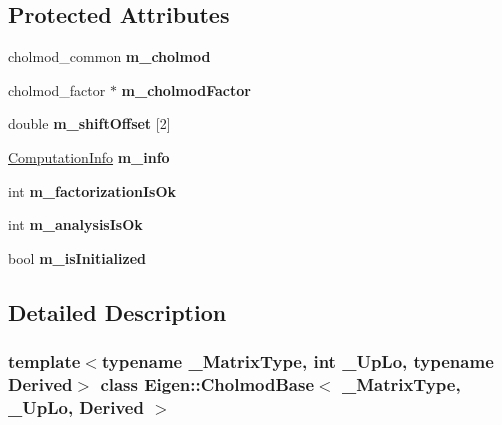 \subsection*{Protected Attributes}
\begin{DoxyCompactItemize}
\item 
\mbox{\label{class_eigen_1_1_cholmod_base_a160c7925c7d7272b721b7c5c715403db}} 
cholmod\+\_\+common {\bfseries m\+\_\+cholmod}
\item 
\mbox{\label{class_eigen_1_1_cholmod_base_a137eb7ffaff34f811fae47d21a8114b6}} 
cholmod\+\_\+factor $\ast$ {\bfseries m\+\_\+cholmod\+Factor}
\item 
\mbox{\label{class_eigen_1_1_cholmod_base_a50e2cf642ffac7e2c64db95100a91d70}} 
double {\bfseries m\+\_\+shift\+Offset} \mbox{[}2\mbox{]}
\item 
\mbox{\label{class_eigen_1_1_cholmod_base_a438be23d40a87065edd187a269c1853d}} 
\mbox{\hyperlink{group__enums_ga85fad7b87587764e5cf6b513a9e0ee5e}{Computation\+Info}} {\bfseries m\+\_\+info}
\item 
\mbox{\label{class_eigen_1_1_cholmod_base_a4618b21b4c72f33d078124e6959446ea}} 
int {\bfseries m\+\_\+factorization\+Is\+Ok}
\item 
\mbox{\label{class_eigen_1_1_cholmod_base_abb97dcccd90c5e529c6708005cc084cd}} 
int {\bfseries m\+\_\+analysis\+Is\+Ok}
\item 
\mbox{\label{class_eigen_1_1_cholmod_base_ac52101f69d048d5c4b036eadf1f13673}} 
bool {\bfseries m\+\_\+is\+Initialized}
\end{DoxyCompactItemize}


\subsection{Detailed Description}
\subsubsection*{template$<$typename \+\_\+\+Matrix\+Type, int \+\_\+\+Up\+Lo, typename Derived$>$\newline
class Eigen\+::\+Cholmod\+Base$<$ \+\_\+\+Matrix\+Type, \+\_\+\+Up\+Lo, Derived $>$}

